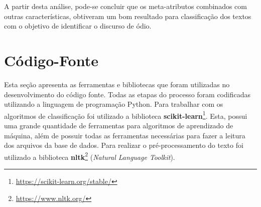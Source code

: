 \begin{table}[h]
\renewcommand \arraystretch{1.25}

\caption{Experimentos com redução de atributos e seus resultados.}\label{tab:resultados-experimentos-com-ganho}
\end{table}

A partir desta análise, pode-se concluir que os meta-atributos combinados com outras características, obtiveram um bom resultado para classificação dos textos com o objetivo de identificar o discurso de ódio.

\section{Código-Fonte}\label{sec:codigo-fonte}
Esta seção apresenta as ferramentas e bibliotecas que foram utilizadas no desenvolvimento do código fonte.
Todas as etapas do processo foram codificadas utilizando a linguagem de programação Python. Para trabalhar com os algoritmos de classificação foi utilizado a biblioteca {\bf scikit-learn}\footnote{\url{https://scikit-learn.org/stable/}}. Esta, possui uma grande quantidade de ferramentas para algoritmos de aprendizado de máquina, além de possuir todas as ferramentas necessárias para fazer a leitura dos arquivos da base de dados. Para realizar o pré-processamento do texto foi utilizado a biblioteca \textbf{nltk}\footnote{\url{https://www.nltk.org/}} ({\it Natural Language Toolkit}).

